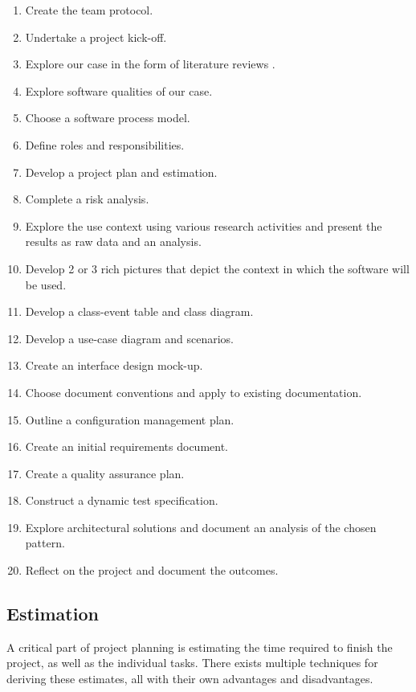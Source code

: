 \begin{enumerate}[label=\alph*)]
  \item Create the team protocol.
  \item  Undertake a project kick-off.
  \item  Explore our case in the form of literature reviews .
  \item  Explore software qualities of our case.
  \item  Choose a software process model.
  \item  Define roles and responsibilities.
  \item  Develop a project plan and estimation.
  \item  Complete a risk analysis.
  \item  Explore the use context using various research activities and present the results as raw data and an analysis.
  \item  Develop 2 or 3 rich pictures that depict the context in which the software will be used.
  \item  Develop a class-event table and class diagram.
  \item  Develop a use-case diagram and scenarios.
  \item  Create an interface design mock-up.
  \item  Choose document conventions and apply to existing documentation.
  \item  Outline a configuration management plan.
  \item  Create an initial requirements document.
  \item  Create a quality assurance plan.
  \item  Construct a dynamic test specification.
  \item  Explore architectural solutions and document an analysis of the chosen pattern.
  \item  Reflect on the project and document the outcomes.
\end{enumerate}


\subsection{Estimation}


A critical part of project planning is estimating the time required to finish the project, as well as the individual tasks. There exists multiple techniques for deriving these estimates, all with their own advantages and disadvantages.

